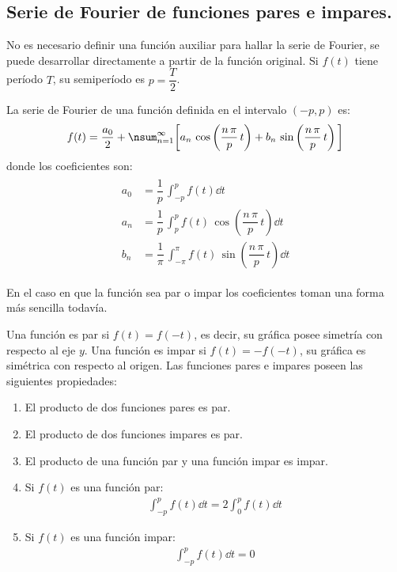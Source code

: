 \subsection{Serie de Fourier de funciones pares e impares.}

No es necesario definir una función auxiliar para hallar la serie de Fourier, se puede desarrollar directamente a partir de la función original. Si $f(t)$ tiene período $T$, su semiperíodo es $p = \dfrac{T}{2}$.
\par
La serie de Fourier de una función definida en el intervalo $(-p, p)$ es:
\begin{align}
f(t) = \dfrac{a_{0}}{2} + \nsum_{n=1}^{\infty} \bigg[ a_{n} \, \cos \left( \dfrac{n \, \pi}{p} \, t \right) + b_{n} \, \sin \left( \dfrac{n \, \pi}{p} \, t \right) \bigg]
\label{eq:ecuacion_06_01_68}
\end{align}
donde los coeficientes son:
\begin{align}
\begin{aligned}
a_{0} &= \dfrac{1}{p} \, \int_{-p}^{p} f(t) \dd{t} \\[0.5em]
a_{n} &= \dfrac{1}{p} \, \int_{p}^{p} f(t) \, \cos \left( \dfrac{n \, \pi}{p} \, t \right) \dd{t} \\[0.5em]
b_{n} &= \dfrac{1}{\pi} \, \int_{-\pi}^{\pi} f(t) \, \sin \left( \dfrac{n \, \pi}{p} \, t \right) \dd{t}
\end{aligned}
\label{eq:ecuacion_06_01_69}
\end{align}

En el caso en que la función sea par o impar los coeficientes toman una forma más sencilla todavía.
\par
Una función es par si $f(t) = f(- t)$, es decir, su gráfica posee simetría con respecto al eje $y$. Una función es impar si $f(t) = -f(- t)$, su gráfica es simétrica con respecto al origen. Las funciones pares e impares poseen las siguientes propiedades:
\begin{enumerate}[label=\roman*)]
\item El producto de dos funciones pares es par.
\item El producto de dos funciones impares es par.
\item El producto de una función par y una función impar es impar.
\item Si $f(t)$ es una función par:
\begin{align*}
\int_{-p}^{p} f(t) \dd{t} = 2 \int_{0}^{p} f(t) \dd{t}
\end{align*}
\item Si $f(t)$ es una función impar:
\begin{align*}
\int_{-p}^{p} f(t) \dd{t} = 0
\end{align*}    
\end{enumerate}

